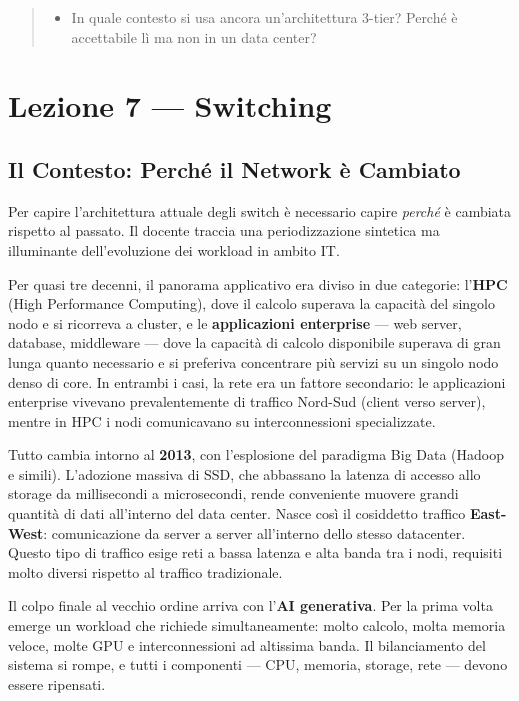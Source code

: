 \documentclass[
  italian,
  openany]{book}
\providecommand{\tightlist}{%
  \setlength{\itemsep}{0pt}\setlength{\parskip}{0pt}}
\begin{document}
\begin{quote}
\begin{itemize}
\tightlist
\item
  In quale contesto si usa ancora un'architettura 3-tier? Perché è
  accettabile lì ma non in un data center?
\end{itemize}
\end{quote}

\newpage

\chapter{Lezione 7 --- Switching}\label{lezione-7-switching}

\section{Il Contesto: Perché il Network è
Cambiato}\label{il-contesto-perchuxe9-il-network-uxe8-cambiato}

Per capire l'architettura attuale degli switch è necessario capire
\emph{perché} è cambiata rispetto al passato. Il docente traccia una
periodizzazione sintetica ma illuminante dell'evoluzione dei workload in
ambito IT.

Per quasi tre decenni, il panorama applicativo era diviso in due
categorie: l'\textbf{HPC} (High Performance Computing), dove il calcolo
superava la capacità del singolo nodo e si ricorreva a cluster, e le
\textbf{applicazioni enterprise} --- web server, database, middleware
--- dove la capacità di calcolo disponibile superava di gran lunga
quanto necessario e si preferiva concentrare più servizi su un singolo
nodo denso di core. In entrambi i casi, la rete era un fattore
secondario: le applicazioni enterprise vivevano prevalentemente di
traffico Nord-Sud (client verso server), mentre in HPC i nodi
comunicavano su interconnessioni specializzate.

Tutto cambia intorno al \textbf{2013}, con l'esplosione del paradigma
Big Data (Hadoop e simili). L'adozione massiva di SSD, che abbassano la
latenza di accesso allo storage da millisecondi a microsecondi, rende
conveniente muovere grandi quantità di dati all'interno del data center.
Nasce così il cosiddetto traffico \textbf{East-West}: comunicazione da
server a server all'interno dello stesso datacenter. Questo tipo di
traffico esige reti a bassa latenza e alta banda tra i nodi, requisiti
molto diversi rispetto al traffico tradizionale.

Il colpo finale al vecchio ordine arriva con l'\textbf{AI generativa}.
Per la prima volta emerge un workload che richiede simultaneamente:
molto calcolo, molta memoria veloce, molte GPU e interconnessioni ad
altissima banda. Il bilanciamento del sistema si rompe, e tutti i
componenti --- CPU, memoria, storage, rete --- devono essere ripensati.
\end{document}
